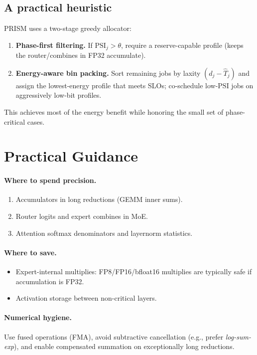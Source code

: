 \documentclass[11pt]{article}
\theoremstyle{plain}
\theoremstyle{definition}
\begin{document}
\subsection{A practical heuristic}
PRISM uses a two-stage greedy allocator:
\begin{enumerate}
  \item \textbf{Phase-first filtering.} If $\mathrm{PSI}_j>\theta$, require a reserve-capable profile (keeps the router/combines in FP32 accumulate).
  \item \textbf{Energy-aware bin packing.} Sort remaining jobs by laxity $(d_j - \hat T_{j})$ and assign the lowest-energy profile that meets SLOs; co-schedule low-$\mathrm{PSI}$ jobs on aggressively low-bit profiles.
\end{enumerate}
This achieves most of the energy benefit while honoring the small set of phase-critical cases.

\section{Practical Guidance}

\paragraph{Where to spend precision.}
\begin{enumerate}
  \item Accumulators in long reductions (GEMM inner sums).
  \item Router logits and expert combines in MoE.
  \item Attention softmax denominators and layernorm statistics.
\end{enumerate}

\paragraph{Where to save.}
\begin{itemize}
  \item Expert-internal multiplies: FP8/FP16/bfloat16 multiplies are typically safe if accumulation is FP32.
  \item Activation storage between non-critical layers.
\end{itemize}

\paragraph{Numerical hygiene.}
Use fused operations (FMA), avoid subtractive cancellation (e.g., prefer \textit{log-sum-exp}), and enable compensated summation on exceptionally long reductions.
\end{document}
